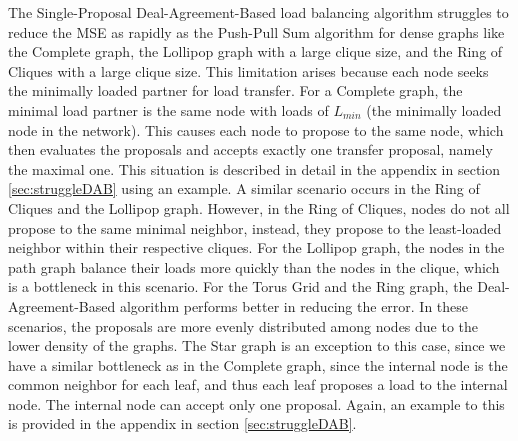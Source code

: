 The Single-Proposal Deal-Agreement-Based load balancing algorithm struggles to reduce the MSE as rapidly as the Push-Pull Sum algorithm for dense graphs like the Complete graph, the Lollipop graph with a large clique size, and the Ring of Cliques with a large clique size. This limitation arises because each node seeks the minimally loaded partner for load transfer. For a Complete graph, the minimal load partner is the same node with loads of $L_{min}$ (the minimally loaded node in the network). This causes each node to propose to the same node, which then evaluates the proposals and accepts exactly one transfer proposal, namely the maximal one. This situation is described in detail in the appendix in section \ref{sec:struggleDAB} using an example. A similar scenario occurs in the Ring of Cliques and the Lollipop graph. However, in the Ring of Cliques, nodes do not all propose to the same minimal neighbor, instead, they propose to the least-loaded neighbor within their respective cliques. For the Lollipop graph, the nodes in the path graph balance their loads more quickly than the nodes in the clique, which is a bottleneck in this scenario. For the Torus Grid and the Ring graph, the Deal-Agreement-Based algorithm performs better in reducing the error. In these scenarios, the proposals are more evenly distributed among nodes due to the lower density of the graphs. The Star graph is an exception to this case, since we have a similar bottleneck as in the Complete graph, since the internal node is the common neighbor for each leaf, and thus each leaf proposes a load to the internal node. The internal node can accept only one proposal. Again, an example to this is provided in the appendix in section \ref{sec:struggleDAB}.

